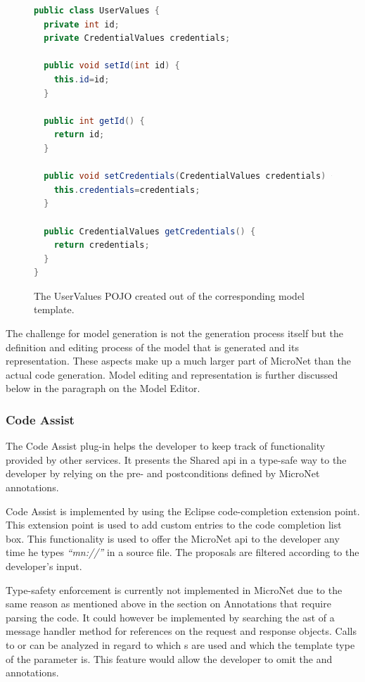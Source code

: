\begin{figure}
\begin{lstlisting}[language=Java,firstnumber=1] 
public class UserValues {
  private int id;
  private CredentialValues credentials;

  public void setId(int id) {
    this.id=id;
  }

  public int getId() {
    return id;
  }

  public void setCredentials(CredentialValues credentials) {
    this.credentials=credentials;
  }

  public CredentialValues getCredentials() {
    return credentials;
  }
}
\end{lstlisting}
\caption{The UserValues POJO created out of the corresponding model template.}
\label{lst:generated_model_class}
\end{figure}

The challenge for model generation is not the generation process itself but the
definition and editing process of the model that is generated and its
representation. These aspects make up a much larger part of MicroNet than the
actual code generation. Model editing and representation is further discussed
below in the paragraph on the Model Editor.

\subsubsection{Code Assist}

The Code Assist plug-in helps the developer to keep track of functionality
provided by other services. It presents the Shared \gls{api} in a type-safe way to
the developer by relying on the pre- and postconditions defined by MicroNet
annotations.

Code Assist is implemented by using the Eclipse code-completion extension point.
This extension point is used to add custom entries to the code completion list
box. This functionality is used to offer the MicroNet \gls{api} to the developer any
time he types \textit{``mn://''} in a source file. The proposals are filtered
according to the developer's input.

Type-safety enforcement is currently not implemented in MicroNet due to the same
reason as mentioned above in the section on Annotations that require parsing
the \ms{} code. It could however be implemented by searching the \gls{ast} of a
message handler method for references on the request and response objects. Calls to
 or  can be analyzed in regard to
which s are used and which the template type of the
parameter is. This feature would allow the developer to omit the
 and  annotations.

